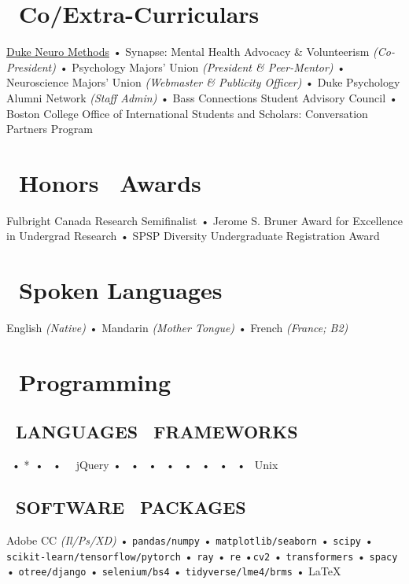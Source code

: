 \documentclass[10pt, a4paper, english]{resume}
\begin{document}
\begin{multicols}{2}
\section*{\faPuzzlePiece \ Co/Extra-Curriculars}
\footnotesize{\href{https://dukeneuromethods.github.io}{Duke Neuro Methods} • Synapse: Mental Health Advocacy \& Volunteerism \textit{(Co-President)} • Psychology Majors' Union \textit{(President \& Peer-Mentor)} • Neuroscience Majors' Union \textit{(Webmaster \& Publicity Officer)} • Duke Psychology Alumni Network \textit{(Staff Admin)} • Bass Connections Student Advisory Council • Boston College Office of International Students and Scholars: Conversation Partners Program}

\vspace{7.5pt}
\section*{\faAward \ Honors \Plus \ Awards}
\footnotesize{Fulbright Canada Research Semifinalist • Jerome S. Bruner Award for Excellence in Undergrad Research • SPSP Diversity Undergraduate Registration Award}
\vfill\null
\columnbreak

\section*{\faCommentDots \ Spoken Languages}
{\footnotesize English \textit{(Native)} • Mandarin \textit{(Mother Tongue)} • French \textit{(France; B2)}

\vspace{7.5pt}\section*{\faBug \ Programming}}

\subsection*{\faCode \ LANGUAGES \Plus \ FRAMEWORKS}
{\footnotesize 
    \ • *\ • \faSass\ • \faJs\ \Plus \ jQuery • \faReact\ • \faBootstrap\ • \faMarkdown\ • \faGit\ • \faPython\ • \faRProject\ • \faDatabase\ • \faLinux\ Unix
}\vspace{5pt} \\

\subsection*{\faCodeBranch \ SOFTWARE \Plus \ PACKAGES}
{\footnotesize 
    Adobe CC \textit{(Il/Ps/XD)} • \texttt{pandas/numpy} • \texttt{matplotlib/seaborn} • \texttt{scipy} • \texttt{scikit-learn/tensorflow/pytorch} • \texttt{ray} • \texttt{re} •\texttt{cv2} • \texttt{transformers} • \texttt{spacy} • \texttt{otree/django} • \texttt{selenium/bs4} • \texttt{tidyverse/lme4/brms} • \LaTeX
}
\vfill\null
\end{multicols}
\end{document}
